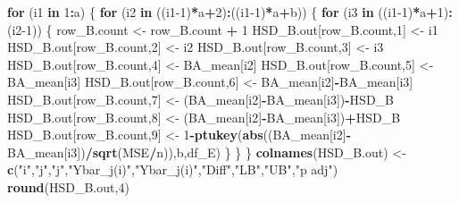 \documentclass[
]{book}
\newenvironment{Shaded}{\begin{snugshade}}{\end{snugshade}}
\newcommand{\ControlFlowTok}[1]{\textcolor[rgb]{0.13,0.29,0.53}{\textbf{#1}}}
\newcommand{\DecValTok}[1]{\textcolor[rgb]{0.00,0.00,0.81}{#1}}
\newcommand{\FunctionTok}[1]{\textcolor[rgb]{0.13,0.29,0.53}{\textbf{#1}}}
\newcommand{\NormalTok}[1]{#1}
\newcommand{\OtherTok}[1]{\textcolor[rgb]{0.56,0.35,0.01}{#1}}
\newcommand{\SpecialCharTok}[1]{\textcolor[rgb]{0.81,0.36,0.00}{\textbf{#1}}}
\newcommand{\StringTok}[1]{\textcolor[rgb]{0.31,0.60,0.02}{#1}}
\begin{document}
\begin{Shaded}
\begin{Highlighting}[]
\ControlFlowTok{for}\NormalTok{ (i1 }\ControlFlowTok{in} \DecValTok{1}\SpecialCharTok{:}\NormalTok{a) \{}
  \ControlFlowTok{for}\NormalTok{ (i2 }\ControlFlowTok{in}\NormalTok{ ((i1}\DecValTok{{-}1}\NormalTok{)}\SpecialCharTok{*}\NormalTok{a}\SpecialCharTok{+}\DecValTok{2}\NormalTok{)}\SpecialCharTok{:}\NormalTok{((i1}\DecValTok{{-}1}\NormalTok{)}\SpecialCharTok{*}\NormalTok{a}\SpecialCharTok{+}\NormalTok{b)) \{}
    \ControlFlowTok{for}\NormalTok{ (i3 }\ControlFlowTok{in}\NormalTok{ ((i1}\DecValTok{{-}1}\NormalTok{)}\SpecialCharTok{*}\NormalTok{a}\SpecialCharTok{+}\DecValTok{1}\NormalTok{)}\SpecialCharTok{:}\NormalTok{(i2}\DecValTok{{-}1}\NormalTok{)) \{}
\NormalTok{    row\_B.count }\OtherTok{\textless{}{-}}\NormalTok{ row\_B.count }\SpecialCharTok{+} \DecValTok{1}
\NormalTok{    HSD\_B.out[row\_B.count,}\DecValTok{1}\NormalTok{] }\OtherTok{\textless{}{-}}\NormalTok{ i1}
\NormalTok{    HSD\_B.out[row\_B.count,}\DecValTok{2}\NormalTok{] }\OtherTok{\textless{}{-}}\NormalTok{ i2}
\NormalTok{    HSD\_B.out[row\_B.count,}\DecValTok{3}\NormalTok{] }\OtherTok{\textless{}{-}}\NormalTok{ i3}
\NormalTok{    HSD\_B.out[row\_B.count,}\DecValTok{4}\NormalTok{] }\OtherTok{\textless{}{-}}\NormalTok{ BA\_mean[i2]}
\NormalTok{    HSD\_B.out[row\_B.count,}\DecValTok{5}\NormalTok{] }\OtherTok{\textless{}{-}}\NormalTok{ BA\_mean[i3]}
\NormalTok{    HSD\_B.out[row\_B.count,}\DecValTok{6}\NormalTok{] }\OtherTok{\textless{}{-}}\NormalTok{ BA\_mean[i2]}\SpecialCharTok{{-}}\NormalTok{BA\_mean[i3]}
\NormalTok{    HSD\_B.out[row\_B.count,}\DecValTok{7}\NormalTok{] }\OtherTok{\textless{}{-}}\NormalTok{ (BA\_mean[i2]}\SpecialCharTok{{-}}\NormalTok{BA\_mean[i3])}\SpecialCharTok{{-}}\NormalTok{HSD\_B}
\NormalTok{    HSD\_B.out[row\_B.count,}\DecValTok{8}\NormalTok{] }\OtherTok{\textless{}{-}}\NormalTok{ (BA\_mean[i2]}\SpecialCharTok{{-}}\NormalTok{BA\_mean[i3])}\SpecialCharTok{+}\NormalTok{HSD\_B}
\NormalTok{    HSD\_B.out[row\_B.count,}\DecValTok{9}\NormalTok{] }\OtherTok{\textless{}{-}} 
      \DecValTok{1}\SpecialCharTok{{-}}\FunctionTok{ptukey}\NormalTok{(}\FunctionTok{abs}\NormalTok{((BA\_mean[i2]}\SpecialCharTok{{-}}\NormalTok{BA\_mean[i3])}\SpecialCharTok{/}\FunctionTok{sqrt}\NormalTok{(MSE}\SpecialCharTok{/}\NormalTok{n)),b,df\_E)}
\NormalTok{    \}}
\NormalTok{  \}}
\NormalTok{\}}
\FunctionTok{colnames}\NormalTok{(HSD\_B.out) }\OtherTok{\textless{}{-}} \FunctionTok{c}\NormalTok{(}\StringTok{"i"}\NormalTok{,}\StringTok{"j"}\NormalTok{,}\StringTok{"j\textquotesingle{}"}\NormalTok{,}\StringTok{"Ybar\_j(i)"}\NormalTok{,}\StringTok{"Ybar\_j\textquotesingle{}(i)"}\NormalTok{,}\StringTok{"Diff"}\NormalTok{,}\StringTok{"LB"}\NormalTok{,}\StringTok{"UB"}\NormalTok{,}\StringTok{"p adj"}\NormalTok{)}
\FunctionTok{round}\NormalTok{(HSD\_B.out,}\DecValTok{4}\NormalTok{)}
\end{Highlighting}
\end{Shaded}
\end{document}
